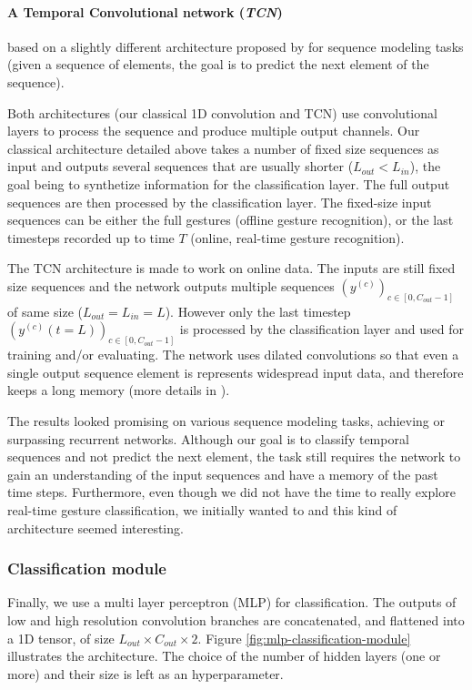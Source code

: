 \documentclass{article}
\begin{document}
\begin{enumerate}
\end{enumerate}

\paragraph{A Temporal Convolutional network (\emph{TCN})} \label{section:tcn} based on a slightly different architecture proposed by \cite{Bai2018-tcn} for sequence modeling tasks (given a sequence of elements, the goal is to predict the next element of the sequence).
\par
Both architectures (our classical 1D convolution and TCN) use convolutional layers to process the sequence and produce multiple output channels.
Our classical architecture detailed above takes a number of fixed size sequences as input and outputs several sequences that are usually shorter ($L_{out} < L_{in}$), the goal being to synthetize information for the classification layer. The full output sequences are then processed by the classification layer. The fixed-size input sequences can be either the full gestures (offline gesture recognition), or the last timesteps recorded up to time $T$ (online, real-time gesture recognition).
\par
The TCN architecture is made to work on online data. The inputs are still fixed size sequences and the network outputs multiple sequences $(y^{(c)})_{c \in [0, C_{out}-1]}$ of same size ($L_{out} = L_{in} = L$). However only the last timestep $(y^{(c)}(t=L))_{c \in [0, C_{out}-1]}$ is processed by the classification layer and used for training and/or evaluating.
The network uses dilated convolutions so that even a single output sequence element is represents widespread input data, and therefore keeps a long memory (more details in \cite{Bai2018-tcn}).
\par
The results looked promising on various sequence modeling tasks, achieving or surpassing recurrent networks. Although our goal is to classify temporal sequences and not predict the next element, the task still requires the network to gain an understanding of the input sequences and have a memory of the past time steps. Furthermore, even though we did not have the time to really explore real-time gesture classification, we initially wanted to and this kind of architecture seemed interesting.

\subsubsection{Classification module} \label{section:classification-module}
Finally, we use a multi layer perceptron (MLP) for classification. The outputs of low and high resolution convolution branches are concatenated, and flattened into a 1D tensor, of size $L_{out} \times C_{out} \times 2$. Figure \ref{fig:mlp-classification-module} illustrates the architecture. The choice of the number of hidden layers (one or more) and their size is left as an hyperparameter.
\end{document}
